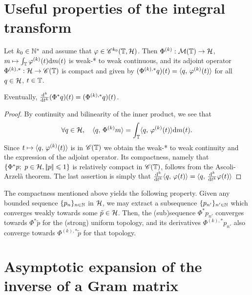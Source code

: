 

\section{Useful properties of the integral transform}


\begin{lem}\label{lem-phi-compact}
  Let $k_0\in \mathbb{N}^*$ and assume that $\varphi\in \mathscr{C}^{k_0}(\mathbb{T},\mathcal{H})$. Then $\Phi^{(k)}:\mathcal{M}(\mathbb{T})\rightarrow \mathcal{H}$, $m\mapsto \int_{\mathbb{T}}\varphi^{(k)}(t)\mathrm{d} m(t)$ is weak-* to weak continuous, and its adjoint operator $\Phi^{(k),*}:\mathcal{H}\rightarrow \mathscr{C}(\mathbb{T})$ is compact and given by $(\Phi^{(k),*}q)(t)=\langle q,\,\varphi^{(k)}(t)\rangle$ for all $q\in \mathcal{H}$, $t\in \mathbb{T}$. 

Eventually, $\frac{\mathrm{d}^k }{\mathrm{d} t^k}(\Phi^{*}q)(t)=(\Phi^{(k),*}q)(t)$.
\end{lem}

\begin{proof}
By continuity and bilinearity of the inner product, we see that
\begin{equation*}
  \forall q\in \mathcal{H},\quad \langle q,\,\Phi^{(k)} m\rangle= \int_{\mathbb{T}}\langle q,\,\varphi^{(k)}(t)\rangle\mathrm{d} m(t).
\end{equation*}
Since $t\mapsto \langle q,\,\varphi^{(k)}(t)\rangle$ is in $\mathscr{C}(\mathbb{T})$ we obtain the weak-* to weak continuity and the expression of the adjoint operator.
Its compactness, namely that $\{\Phi^*p; \ p\in\mathcal{H}, |\!| p |\!|\leqslant 1\}$ is relatively compact in $\mathscr{C}(\mathbb{T})$,  follows from the  Ascoli-Arzel\`a theorem.
The last assertion is simply that $\frac{\mathrm{d}^k }{\mathrm{d} t^k}\langle q,\,\varphi(t)\rangle=\langle q,\,\frac{\mathrm{d}^k }{\mathrm{d} t^k}\varphi(t)\rangle$
\end{proof}

The compactness mentioned above yields the following property. Given any bounded sequence $\{p_n\}_{n\in\mathbb{N}}$ in $\mathcal{H}$, we may extract a subsequence $\{p_{n'}\}_{n'\in\mathbb{N}}$ which converges weakly towards some $\tilde{p}\in \mathcal{H}$. Then, the (sub)sequence $\Phi^* p_{n'}$ converges towards $\Phi^*\tilde{p}$ for the (strong) uniform topology, and its derivatives $\Phi^{(k),*}p_{n'}$ also converge towards $\Phi^{(k),*}\tilde{p}$ for that topology.


\section{Asymptotic expansion of the inverse of a Gram matrix}


